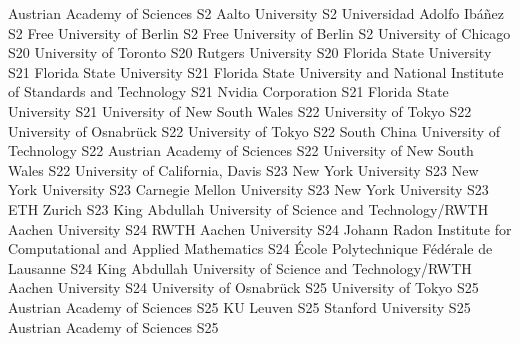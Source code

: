 \begin{multicols}{2}
{Austrian Academy of Sciences}
{S2}
{}
{Aalto University}
{S2}
{}
{Universidad Adolfo Ibáñez}
{S2}
{}
{Free University of Berlin}
{S2}
{}
{Free University of Berlin}
{S2}
{}
{University of Chicago}
{S20}
{}
{University of Toronto}
{S20}
{}
{Rutgers University}
{S20}
{}
{Florida State University}
{S21}
{}
{Florida State University}
{S21}
{}
{Florida State University and National Institute of Standards and Technology}
{S21}
{}
{Nvidia Corporation}
{S21}
{}
{Florida State University}
{S21}
{}
{University of New South Wales}
{S22}
{}
{University of Tokyo}
{S22}
{}
{University of Osnabrück}
{S22}
{}
{University of Tokyo}
{S22}
{}
{South China University of Technology}
{S22}
{}
{Austrian Academy of Sciences}
{S22}
{}
{University of New South Wales}
{S22}
{}
{University of California, Davis}
{S23}
{}
{New York University}
{S23}
{}
{New York University}
{S23}
{}
{Carnegie Mellon University}
{S23}
{}
{New York University}
{S23}
{}
{ETH Zurich}
{S23}
{}
{King Abdullah University of Science and Technology/RWTH Aachen University}
{S24}
{}
{RWTH Aachen University}
{S24}
{}
{Johann Radon Institute for Computational and Applied Mathematics}
{S24}
{}
{École Polytechnique Fédérale de Lausanne}
{S24}
{}
{King Abdullah University of Science and Technology/RWTH Aachen University}
{S24}
{}
{University of Osnabrück}
{S25}
{}
{University of Tokyo}
{S25}
{}
{Austrian Academy of Sciences}
{S25}
{}
{KU Leuven}
{S25}
{}
{Stanford University}
{S25}
{}
{Austrian Academy of Sciences}
{S25}
{}

\end{multicols}
